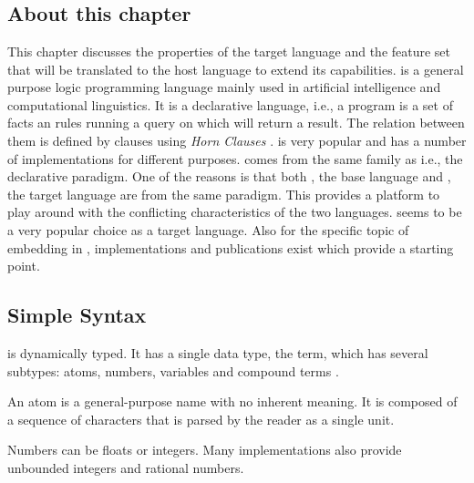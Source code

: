 \documentclass[thesis-solanki.tex]{subfiles}
\begin{document}
\chapter{}\label{chap:pwp}


\section{About this chapter}

This chapter discusses the properties of the target language  and the feature set that will be
translated to the host language to extend its capabilities.
 is a general purpose logic programming language mainly used in artificial intelligence and
computational linguistics.
It is a declarative language, i.e., a program is a set of facts an rules running a query on which will return a
result.
The relation between them is defined by clauses using \textit{Horn Clauses} \cite{wikiprolog}.
 is very popular and has a number of implementations
\cite{website:comparisonofprologimplementationswiki} for different purposes.
 comes from the same family as  i.e., the declarative paradigm.
One of the reasons is that both , the base language and , the target language
are from the same paradigm.
This provides a platform to play around with the conflicting characteristics of the two languages.
 seems to be a very popular choice as a target language.
Also for the specific topic of embedding  in , implementations and publications
exist which provide a starting point.
  
\section{Simple Syntax}

 is dynamically typed.
It has a single data type, the term, which has several subtypes: atoms, numbers, variables and compound terms
\cite{wikiprolog}.


An atom is a general-purpose name with no inherent meaning.
It is composed of a sequence of characters that is parsed by the  reader as a single unit.

Numbers can be floats or integers.
Many  implementations also provide unbounded integers and rational numbers.
\end{document}
